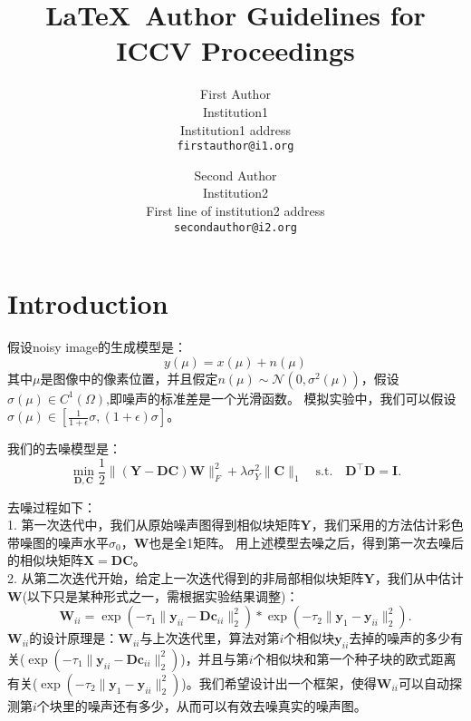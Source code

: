 \documentclass[10pt,twocolumn,letterpaper]{article}
\begin{document}
\title{\LaTeX\ Author Guidelines for ICCV Proceedings}

\author{First Author\\
Institution1\\
Institution1 address\\
{\tt\small firstauthor@i1.org}
\and
Second Author\\
Institution2\\
First line of institution2 address\\
{\tt\small secondauthor@i2.org}
}

\maketitle


\section{Introduction}

假设noisy image的生成模型是：
\begin{equation}
y(\mu)=x(\mu) + n(\mu)
\end{equation}
其中$\mu$是图像中的像素位置，并且假定$n(\mu)\sim \mathcal{N}(0,\sigma^{2}({\mu}))$，假设$\sigma({\mu})\in C^{1}(\Omega)$,即噪声的标准差是一个光滑函数。
模拟实验中，我们可以假设$\sigma({\mu})\in [\frac{1}{1+\epsilon}\sigma, (1+\epsilon)\sigma]$。

我们的去噪模型是：
\begin{equation}
\min_{\mathbf{D},\mathbf{C}}\frac{1}{2}\|(\mathbf{Y}-\mathbf{D}\mathbf{C})\mathbf{W}\|_{F}^{2}
+
\lambda\sigma_{Y}^{2}\|\mathbf{C}\|_{1}
\quad
\text{s.t.}
\quad
\mathbf{D}^{\top}\mathbf{D} =\mathbf{I}. 
\end{equation}

去噪过程如下：
\\
1. 第一次迭代中，我们从原始噪声图得到相似块矩阵$\mathbf{Y}$，我们采用\cite{Chen2015ICCV}的方法估计彩色带噪图的噪声水平$\sigma_{0}$，$\mathbf{W}$也是全1矩阵。
用上述模型去噪之后，得到第一次去噪后的相似块矩阵$\mathbf{X}=\mathbf{DC}$。
\\
2. 从第二次迭代开始，给定上一次迭代得到的非局部相似块矩阵$\mathbf{Y}$，我们从中估计$\mathbf{W}$(以下只是某种形式之一，需根据实验结果调整)：
\begin{equation}
\mathbf{W}_{ii} 
=
\exp(-\tau_{1}\|\mathbf{y}_{ii}-\mathbf{D}\mathbf{c}_{ii}\|_{2}^{2})
*\exp(-\tau_{2}\|\mathbf{y}_{1}-\mathbf{y}_{ii}\|_{2}^{2}).
\end{equation}
$\mathbf{W}_{ii}$的设计原理是：$\mathbf{W}_{ii}$与上次迭代里，算法对第$i$个相似块$\mathbf{y}_{ii}$去掉的噪声的多少有关($\exp(-\tau_{1}\|\mathbf{y}_{ii}-\mathbf{D}\mathbf{c}_{ii}\|_{2}^{2})$)，并且与第$i$个相似块和第一个种子块的欧式距离有关($\exp(-\tau_{2}\|\mathbf{y}_{1}-\mathbf{y}_{ii}\|_{2}^{2})$)。我们希望设计出一个框架，使得$\mathbf{W}_{ii}$可以自动探测第$i$个块里的噪声还有多少，从而可以有效去噪真实的噪声图。
\end{document}
